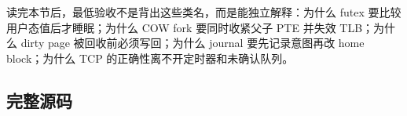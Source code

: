 \begin{rubricbox}
读完本节后，最低验收不是背出这些类名，而是能独立解释：为什么 futex 要比较用户态值后才睡眠；为什么 COW fork 要同时收紧父子 PTE 并失效 TLB；为什么 dirty page 被回收前必须写回；为什么 journal 要先记录意图再改 home block；为什么 TCP 的正确性离不开定时器和未确认队列。
\end{rubricbox}

\subsection{完整源码}


